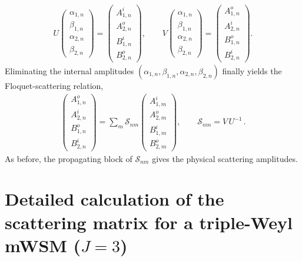 \documentclass[aps,prb,onecolumn,longbibliography,nofootinbib,citeautoscript,10pt]{revtex4-2}
\begin{document}
\begin{align}
U \begin{pmatrix}
\alpha_{1,n}\\
\beta_{1,n}\\
\alpha_{2,n}\\
\beta_{2,n}
\end{pmatrix}
= \begin{pmatrix}
A_{1,n}^{i}\\
A_{2,n}^{o}\\
B_{1,n}^{i}\\
B_{2,n}^{o}
\end{pmatrix}
, \qquad
V \begin{pmatrix}
\alpha_{1,n}\\
\beta_{1,n}\\
\alpha_{2,n}\\
\beta_{2,n}
\end{pmatrix}
= \begin{pmatrix}
A_{1,n}^{o}\\
A_{2,n}^{i}\\
B_{1,n}^{o}\\
B_{2,n}^{i}
\end{pmatrix}.
\end{align}
Eliminating the internal amplitudes $(\alpha_{1,n},\beta_{1,n},\alpha_{2,n},\beta_{2,n})$ finally yields the Floquet-scattering relation,
\begin{align}
\begin{pmatrix}
A_{1,n}^{o}\\
A_{2,n}^{i}\\
B_{1,n}^{o}\\
B_{2,n}^{i} \end{pmatrix}
= \sum_m
\mathcal{S}_{nm}
\begin{pmatrix}
A_{1,m}^{i}\\
A_{2,m}^{o}\\
B_{1,m}^{i}\\
B_{2,m}^{o}
\end{pmatrix} , 
\qquad
\mathcal{S}_{nm}=V \,U^{-1}\,.
\end{align}
As before, the propagating block of $\mathcal{S}_{nm}$ gives the physical scattering amplitudes.


\section{Detailed calculation of the scattering matrix for a triple-Weyl mWSM ($J=3$)}\label{appendiX_Weyl_j3}
\end{document}
